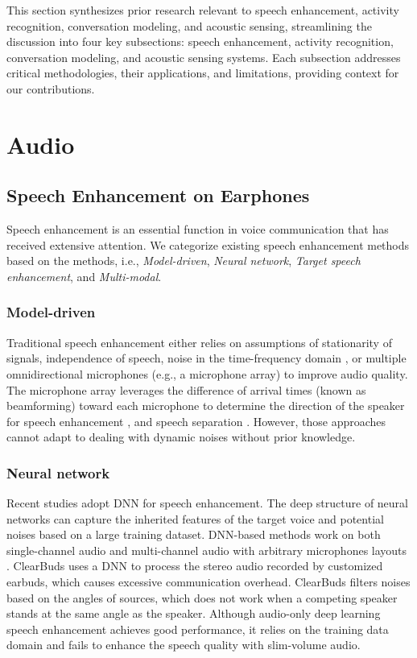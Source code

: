 This section synthesizes prior research relevant to speech enhancement, activity recognition, conversation modeling, and acoustic sensing, streamlining the discussion into four key subsections: speech enhancement, activity recognition, conversation modeling, and acoustic sensing systems. Each subsection addresses critical methodologies, their applications, and limitations, providing context for our contributions.

\section{Audio}

\subsection{Speech Enhancement on Earphones}
Speech enhancement is an essential function in voice communication that has received extensive attention. We categorize existing speech enhancement methods based on the methods, i.e., \textit{Model-driven}, \textit{Neural network}, \textit{Target speech enhancement}, and  \textit{Multi-modal}.

\subsubsection{Model-driven}
Traditional speech enhancement either relies on assumptions of stationarity of signals, independence of speech, noise in the time-frequency domain \cite{ephraim1995signal}, or multiple omnidirectional microphones (e.g., a microphone array) to improve audio quality. The microphone array leverages the difference of arrival times (known as beamforming) toward each microphone to determine the direction of the speaker for speech enhancement \cite{yousefian2014hybrid,ji2017coherence}, and speech separation \cite{wood2017blind,kitamura2016determined}. However, those approaches cannot adapt to dealing with dynamic noises without prior knowledge.

\subsubsection{Neural network}
Recent studies adopt DNN \cite{subakan2021attention, zhang2021microphone, chatterjee2022clearbuds} for speech enhancement. The deep structure of neural networks can capture the inherited features of the target voice and potential noises based on a large training dataset.
DNN-based methods work on both single-channel audio \cite{subakan2021attention} and multi-channel audio with arbitrary microphones layouts \cite{zhang2021microphone}. ClearBuds \cite{chatterjee2022clearbuds} uses a DNN to process the stereo audio recorded by customized earbuds, which causes excessive communication overhead. ClearBuds filters noises based on the angles of sources, which does not work when a competing speaker stands at the same angle as the speaker.
Although audio-only deep learning speech enhancement achieves good performance, it relies on the training data domain and fails to enhance the speech quality with slim-volume audio.

